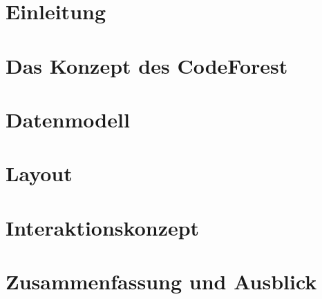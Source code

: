 \chapter{Einleitung}
\chapter{Das Konzept des CodeForest}
\chapter{Datenmodell}
\chapter{Layout}
\chapter{Interaktionskonzept}
\chapter{Zusammenfassung und Ausblick}